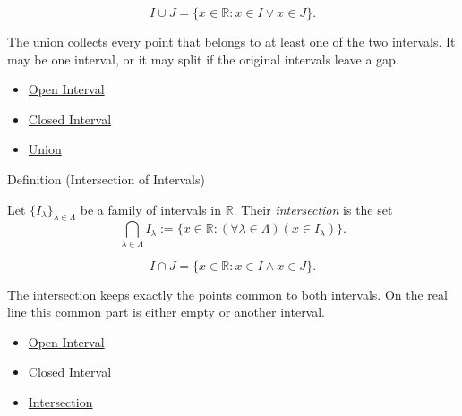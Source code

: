 \begin{remark*}
\[
I\cup J=\{x\in\mathbb{R}:x\in I\lor x\in J\}.
\]
\end{remark*}

\begin{remark*}[Interpretation]
The union collects every point that belongs to at least one of the two
intervals. It may be one interval, or it may split if the original intervals
leave a gap.
\end{remark*}

\begin{dependencies}
\begin{itemize}
  \item \hyperref[def:open-interval]{Open Interval}
  \item \hyperref[def:closed-interval]{Closed Interval}
  \item \hyperref[def:union]{Union}
\end{itemize}
\end{dependencies}

\begin{definitionbox}{Definition (Intersection of Intervals)}
\begin{definition}
\label{def:intersection-of-intervals}
Let $\{I_\lambda\}_{\lambda\in\Lambda}$ be a family of intervals in
$\mathbb{R}$.  Their \emph{intersection} is the set
\[
  \bigcap_{\lambda\in\Lambda}I_\lambda
  :=
  \{x\in\mathbb{R}:(\forall\lambda\in\Lambda)(x\in I_\lambda)\}.
\]
\end{definition}
\end{definitionbox}

\begin{remark*}
\[
I\cap J=\{x\in\mathbb{R}:x\in I\land x\in J\}.
\]
\end{remark*}

\begin{remark*}[Interpretation]
The intersection keeps exactly the points common to both intervals. On the
real line this common part is either empty or another interval.
\end{remark*}

\begin{dependencies}
\begin{itemize}
  \item \hyperref[def:open-interval]{Open Interval}
  \item \hyperref[def:closed-interval]{Closed Interval}
  \item \hyperref[def:intersection]{Intersection}
\end{itemize}
\end{dependencies}

